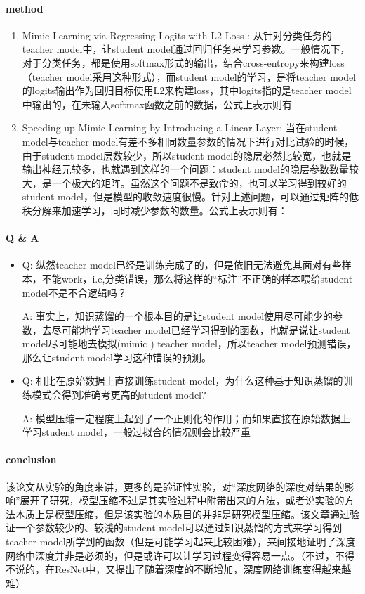 \documentclass[11pt]{article} %
\begin{document}
\begin{CJK}{UTF8}{gkai}
\paragraph{method}
\begin{enumerate}
\item Mimic Learning via Regressing Logits with L2 Loss : 从针对分类任务的teacher model中，让student model通过回归任务来学习参数。一般情况下，对于分类任务，都是使用softmax形式的输出，结合cross-entropy来构建loss（teacher model采用这种形式），而student model的学习，是将teacher model的logits输出作为回归目标使用L2来构建loss，其中logits指的是teacher model中输出的，在未输入softmax函数之前的数据，公式上表示则有
\item Speeding-up Mimic Learning by Introducing a Linear Layer: 当在student model与teacher model有差不多相同数量参数的情况下进行对比试验的时候，由于student model层数较少，所以student model的隐层必然比较宽，也就是输出神经元较多，也就遇到这样的一个问题：student model的隐层参数数量较大，是一个极大的矩阵。虽然这个问题不是致命的，也可以学习得到较好的student model，但是模型的收敛速度很慢。针对上述问题，可以通过矩阵的低秩分解来加速学习，同时减少参数的数量。公式上表示则有：
\end{enumerate}
\paragraph{Q \& A}
\begin{itemize}
\item
Q: 纵然teacher model已经是训练完成了的，但是依旧无法避免其面对有些样本，不能work，i.e,分类错误，那么将这样的“标注”不正确的样本喂给student model不是不合逻辑吗？\par
A: 事实上，知识蒸馏的一个根本目的是让student model使用尽可能少的参数，去尽可能地学习teacher model已经学习得到的函数，也就是说让student model尽可能地去模拟(mimic ) teacher model，所以teacher model预测错误，那么让student model学习这种错误的预测。
\item
Q: 相比在原始数据上直接训练student model，为什么这种基于知识蒸馏的训练模式会得到准确考更高的student model? \par
A: 模型压缩一定程度上起到了一个正则化的作用；而如果直接在原始数据上学习student model，一般过拟合的情况则会比较严重
\end{itemize}
\paragraph{conclusion}
该论文从实验的角度来讲，更多的是验证性实验，对“深度网络的深度对结果的影响”展开了研究，模型压缩不过是其实验过程中附带出来的方法，或者说实验的方法本质上是模型压缩，但是该实验的本质目的并非是研究模型压缩。该文章通过验证一个参数较少的、较浅的student model可以通过知识蒸馏的方式来学习得到teacher model所学到的函数（但是可能学习起来比较困难），来间接地证明了深度网络中深度并非是必须的，但是或许可以让学习过程变得容易一点。（不过，不得不说的，在ResNet中，又提出了随着深度的不断增加，深度网络训练变得越来越难）


\end{CJK}
\end{document}
